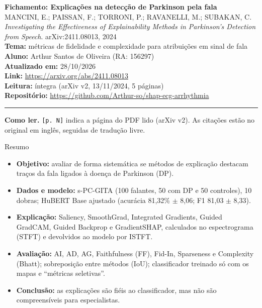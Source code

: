 \documentclass[11pt,a4paper]{article}
\begin{document}
\begin{center}
    {\LARGE \textbf{Fichamento: Explicações na detecção de Parkinson pela fala}} \\[0.35em]
    {\large MANCINI, E.; PAISSAN, F.; TORRONI, P.; RAVANELLI, M.; SUBAKAN, C. \textit{Investigating the Effectiveness of Explainability Methods in Parkinson's Detection from Speech}. arXiv:2411.08013, 2024} \\[0.3em]
    \textbf{Tema:} métricas de fidelidade e complexidade para atribuições em sinal de fala \\[0.2em]
    \textbf{Aluno:} Arthur Santos de Oliveira (RA: 156297) \\[0.2em]
    \textbf{Atualizado em:} 28/10/2026 \\[0.2em]
    \textbf{Link:} \url{https://arxiv.org/abs/2411.08013} \\[0.2em]
    \textbf{Leitura:} íntegra (arXiv v2, 13/11/2024, 5 páginas) \\[0.2em]
    \textbf{Repositório:} \url{https://github.com/Arthur-so/shap-ecg-arrhythmia}
\end{center}
\vspace{-0.5em}
\hrule
\vspace{0.8em}

\textbf{Como ler.} \texttt{[p. N]} indica a página do PDF lido (arXiv v2). As citações estão no original em inglês, seguidas de tradução livre.

\begin{infobox}[note]{Resumo}
\begin{itemize}
\item \textbf{Objetivo:} avaliar de forma sistemática se métodos de explicação destacam traços da fala ligados à doença de Parkinson (DP).
\item \textbf{Dados e modelo:} s-PC-GITA (100 falantes, 50 com DP e 50 controles), 10 dobras; HuBERT Base ajustado (acurácia 81,32\% $\pm$ 8,06; F1 81,03 $\pm$ 8,33).
\item \textbf{Explicação:} Saliency, SmoothGrad, Integrated Gradients, Guided GradCAM, Guided Backprop e GradientSHAP, calculados no espectrograma (STFT) e devolvidos ao modelo por ISTFT.
\item \textbf{Avaliação:} AI, AD, AG, Faithfulness (FF), Fid-In, Sparseness e Complexity (Bhatt); sobreposição entre métodos (IoU); classificador treinado só com os mapas e “métricas seletivas”.
\item \textbf{Conclusão:} as explicações são fiéis ao classificador, mas não são compreensíveis para especialistas.
\end{itemize}
\end{infobox}
\end{document}
